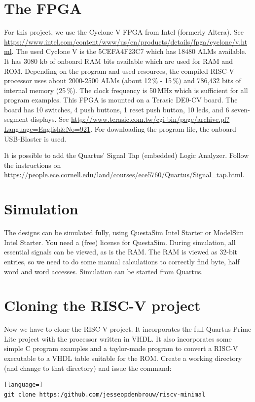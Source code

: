 \documentclass[12pt]{article}
\begin{document}
\section{The FPGA}
For this project, we use the Cyclone V FPGA from Intel (formerly Altera). See \url{https://www.intel.com/content/www/us/en/products/details/fpga/cyclone/v.html}.
The used Cyclone V is the 5CEFA4F23C7 which has 18480 ALMs available. It has 3080 kb of onboard RAM bits available which are used for RAM and ROM. Depending on the program and used resources, the compiled RISC-V processor uses about 2000-2500 ALMs (about 12\,\% - 15\,\%) and 786,432 bits of internal memory (25\,\%). The clock frequency is 50\,MHz which is sufficient for all program examples. This FPGA is mounted on a Terasic DE0-CV board. The board has 10 switches, 4 push buttons, 1 reset push button, 10 leds, and 6 seven-segment displays. See \url{http://www.terasic.com.tw/cgi-bin/page/archive.pl?Language=English&No=921}. For downloading the program file, the onboard USB-Blaster is used.

It is possible to add the Quartus' Signal Tap (embedded) Logic Analyzer. Follow the instructions on \url{https://people.ece.cornell.edu/land/courses/ece5760/Quartus/Signal_tap.html}.

\section{Simulation}
The designs can be simulated fully, using QuestaSim Intel Starter or ModelSim Intel Starter. You need a (free) license for QuestaSim. During simulation, all essential signals can be viewed, as is the RAM. The RAM is viewed as 32-bit entries, so we need to do some manual calculations to correctly find byte, half word and word accesses. Simulation can be started from Quartus.

\section{Cloning the RISC-V project}
\label{sec:cloning}
Now we have to clone the RISC-V project. It incorporates the full Quartus Prime Lite project with the processor written in VHDL. It also incorporates some simple C program examples and a taylor-made program to convert a RISC-V executable to a VHDL table suitable for the ROM. Create a working directory (and change to that directory) and issue the command:

\begin{lstlisting}[language=]
git clone https:/github.com/jesseopdenbrouw/riscv-minimal
\end{lstlisting}
\end{document}
